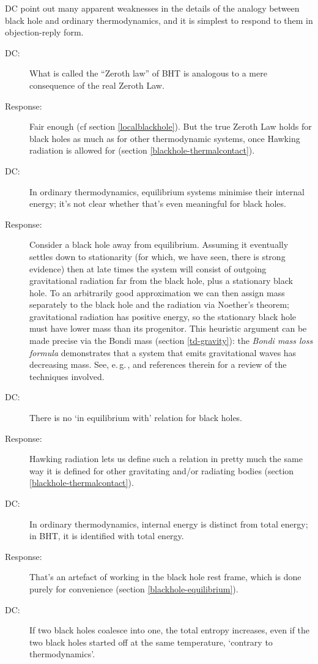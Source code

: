 \documentclass[12pt]{article}
\newcommand{\egc}{\mbox{e.\,g.\,}}
\begin{document}
DC point out many apparent weaknesses in the details of the analogy between black hole and ordinary thermodynamics, and it is simplest to respond to them in objection-reply form.
\begin{description}
\item[DC:] What is called the ``Zeroth law'' of BHT is analogous to a mere consequence of the real Zeroth Law.
\item[Response:] Fair enough (cf section \ref{localblackhole}). But the true Zeroth Law holds for black holes as much as for other thermodynamic systems, once Hawking radiation is allowed for (section \ref{blackhole-thermalcontact}).
\item[DC:] In ordinary thermodynamics, equilibrium systems minimise their internal energy; it's not clear whether that's even meaningful for black holes.
\item[Response:] Consider a black hole away from equilibrium. Assuming it eventually settles down to stationarity (for which, we have seen, there is strong evidence) then at late times the system will consist of outgoing gravitational radiation far from the black hole, plus a stationary black hole. To an arbitrarily good approximation we can then assign mass separately to the black hole and the radiation via Noether's theorem; gravitational radiation has positive energy, so the stationary black hole must have lower mass than its progenitor. This heuristic argument can be made precise via the Bondi mass (section \ref{td-gravity}): the \emph{Bondi mass loss formula} demonstrates that a system that emits gravitational waves has decreasing mass. See, \egc,  and references therein for a review of the techniques involved.
\item[DC:] There is no `in equilibrium with' relation for black holes.
\item[Response:] Hawking radiation lets us define such a relation in pretty much the same way it is defined for other gravitating and/or radiating bodies (section \ref{blackhole-thermalcontact}).
\item[DC:] In ordinary thermodynamics, internal energy is distinct from total energy; in BHT, it is identified with total energy.
\item[Response:] That's an artefact of working in the black hole rest frame, which is done purely for convenience (section \ref{blackhole-equilibrium}).
\item[DC:] If two black holes coalesce into one, the total entropy increases, even if the two black holes started off at the same temperature, `contrary to thermodynamics'.

\end{description}
\end{document}
